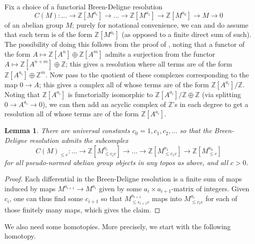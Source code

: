 \documentclass[11pt]{amsbook}
\numberwithin{equation}{section}
\numberwithin{theorem}{section}
\newtheorem{lemma}[theorem]{Lemma}
\theoremstyle{definition}
\begin{document}
Fix a choice of a functorial Breen-Deligne resolution
\[
C(M):\ldots \to \mathbb Z[M^{a_i}]\to\ldots\to\mathbb
Z[M^{a_1}]\to\mathbb Z[M^{a_0}]\to M\to 0
\]
of an abelian group $M$; purely for notational convenience, we can and do assume that each term is of the form $\mathbb Z[M^{a_i}]$ (as opposed to a finite direct sum of such). The possibility of doing this follows from the proof of \cite[Theorem 4.10]{Condensed}, noting that a functor of the form $A\mapsto \mathbb Z[A^n]\oplus \mathbb Z[A^m]$ admits a surjection from the functor $A\mapsto \mathbb Z[A^{n+m}]\oplus \mathbb Z$; this gives a resolution where all terms are of the form $\mathbb Z[A^{a_i}]\oplus \mathbb Z^m$. Now pass to the quotient of these complexes corresponding to the map $0\to A$; this gives a complex all of whose terms are of the form $\mathbb Z[A^{a_i}]/\mathbb Z$. Noting that $\mathbb Z[A^{a_i}]$ is functorially isomorphic to $\mathbb Z[A^{a_i}]/\mathbb Z\oplus \mathbb Z$ (via splitting $0\to A^{a_i}\to 0$), we can then add an acyclic complex of $\mathbb Z$'s in each degree to get a resolution all of whose terms are of the form $\mathbb Z[A^{a_i}]$.

\begin{lemma}\label{lem:constantsdeligne} There are universal constants $c_0=1,c_1,c_2,\ldots$ so that the Breen-Deligne resolution admits the subcomplex
\[
C(M)_{\leq c}: \ldots \to \mathbb Z[M^{a_i}_{\leq c_ic}]\to\ldots\to\mathbb
Z[M^{a_1}_{\leq c_1c}]\to\mathbb Z[M^{a_0}_{\leq c}]
\]
for all pseudo-normed abelian group objects in any topos as above, and all $c>0$.
\end{lemma}

\begin{proof} Each differential in the Breen-Deligne resolution is a finite sum of maps induced by maps $M^{a_{i+1}}\to M^{a_i}$ given by some $a_i\times a_{i+1}$-matrix of integers. Given $c_i$, one can thus find some $c_{i+1}$ so that $M^{a_{i+1}}_{\leq c_{i+1}c}$ maps into $M^{a_i}_{\leq c_ic}$ for each of those finitely many maps, which gives the claim.
\end{proof}

We also need some homotopies. More precisely, we start with the following homotopy.
\end{document}
